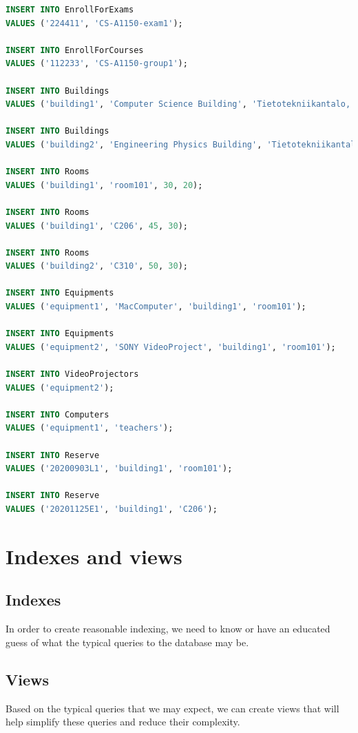 \documentclass{article}
\begin{document}
\begin{lstlisting}[language=SQL]
INSERT INTO EnrollForExams
VALUES ('224411', 'CS-A1150-exam1');

INSERT INTO EnrollForCourses
VALUES ('112233', 'CS-A1150-group1');

INSERT INTO Buildings
VALUES ('building1', 'Computer Science Building', 'Tietotekniikantalo, Konemiehentie 2, 02150 Espoo');

INSERT INTO Buildings
VALUES ('building2', 'Engineering Physics Building', 'Tietotekniikantalo, Konemiehentie 4, 02150 Espoo');

INSERT INTO Rooms
VALUES ('building1', 'room101', 30, 20);

INSERT INTO Rooms
VALUES ('building1', 'C206', 45, 30);

INSERT INTO Rooms
VALUES ('building2', 'C310', 50, 30);

INSERT INTO Equipments
VALUES ('equipment1', 'MacComputer', 'building1', 'room101');

INSERT INTO Equipments
VALUES ('equipment2', 'SONY VideoProject', 'building1', 'room101');

INSERT INTO VideoProjectors
VALUES ('equipment2');

INSERT INTO Computers
VALUES ('equipment1', 'teachers');

INSERT INTO Reserve
VALUES ('20200903L1', 'building1', 'room101');

INSERT INTO Reserve
VALUES ('20201125E1', 'building1', 'C206'); 
\end{lstlisting}

\section{Indexes and views}

\subsection{Indexes}

In order to create reasonable indexing, we need to know or have an educated guess of what the typical queries to the database may be.

\subsection{Views}
Based on the typical queries that we may expect, we can create views that will help simplify these queries and reduce their complexity.
\end{document}
